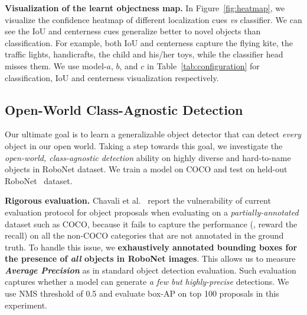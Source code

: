 \documentclass[10pt,twocolumn,letterpaper]{article}
\newcommand{\figureref}[1]{Figure~\ref{#1}}
\newcommand{\tableref}[1]{Table~\ref{#1}}
\renewcommand{\paragraph}[1]{\vspace{1mm}\noindent\textbf{#1}}
\begin{document}
\paragraph{{Visualization of the learnt objectness map.}}\quad
In \figureref{fig:heatmap}, we visualize the confidence heatmap of different localization cues \textit{vs} classifier. We can see the IoU and centerness cues generalize better to novel objects than classification. For example, both IoU and centerness capture the flying kite, the traffic lights, handicrafts, the child and his/her toys, while the classifier head misses them. We use model-$a$, $b$, and $c$ in \tableref{tab:configuration} for classification, IoU and centerness visualization respectively.


\subsection{Open-World Class-Agnostic Detection}
\label{sec:robonet_detection}
Our ultimate goal is to learn a generalizable object detector that can detect \textit{every} object in our open world. Taking a step towards this goal, we investigate the \textit{open-world, class-agnostic detection} ability on highly diverse and hard-to-name objects in RoboNet dataset. We train a model on COCO and test on held-out RoboNet~\cite{dasari2019robonet} dataset.


\paragraph{Rigorous evaluation.} \quad
Chavali et al.~\cite{chavali2016object} report the vulnerability of current evaluation protocol for object proposals when evaluating on a \textit{partially-annotated} dataset such as COCO, because it fails to capture the performance (\eg, reward the recall) on all the non-COCO categories that are not annotated in the ground truth. To handle this issue, we \textbf{exhaustively annotated bounding boxes for the presence of \textit{all} objects in RoboNet images}. This allows us to measure \textit{\textbf{Average Precision}} as in standard object detection evaluation. Such evaluation captures whether a model can generate \textit{a few but highly-precise} detections. We use NMS threshold of 0.5 and evaluate box-AP on top 100 proposals in this experiment. 
\end{document}
